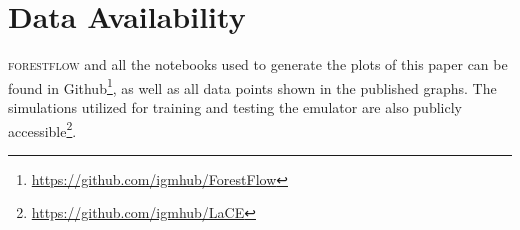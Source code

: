 \documentclass[longauth]{aa}
\newcommand{\forestflow}{\textsc{forestflow}\xspace}
\begin{document}
\section*{Data Availability}

\forestflow and all the notebooks used to generate the plots of this paper can be found in Github\footnote{\url{https://github.com/igmhub/ForestFlow}}, as well as all data points shown in the published graphs. The simulations utilized for training and testing the emulator are also publicly accessible\footnote{\url{https://github.com/igmhub/LaCE}}.





\end{document}

